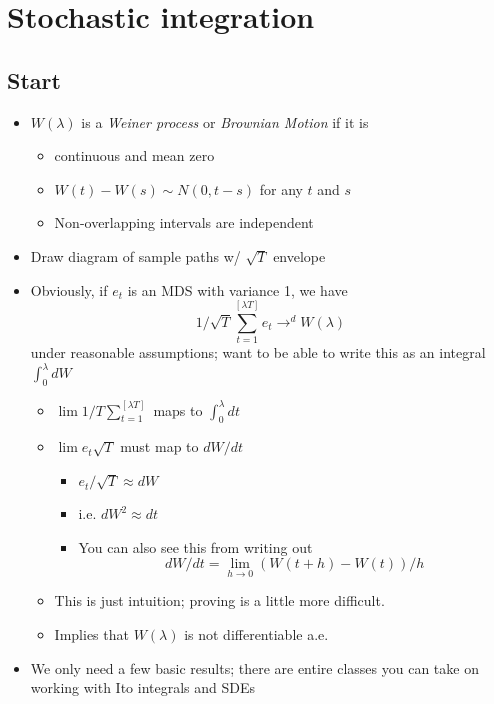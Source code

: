 

\section{Stochastic integration}

\subsection{Start}

\begin{itemize}
\item
  $W(\lambda)$ is a \emph{Weiner process} or \emph{Brownian Motion} if it is
  \begin{itemize}
  \item continuous and mean zero
  \item $W(t) - W(s) \sim N(0, t-s)$ for any $t$ and $s$
  \item Non-overlapping intervals are independent
  \end{itemize}
\item Draw diagram of sample paths w/ $\sqrt T$ envelope
\item Obviously, if $e_t$ is an MDS with variance 1, we have
  \[1/\sqrt{T} \sum_{t=1}^{[\lambda T]} e_t \to^d W(\lambda)\]
  under reasonable assumptions; want to be able to write this as an
  integral $\int_0^\lambda dW$

  \begin{itemize}
  \item
    $\lim 1/T \sum_{t=1}^{[\lambda T]}$ maps to $\int_0^\lambda dt$
  \item
    $\lim e_t \sqrt{T}$ must map to $dW/dt$

    \begin{itemize}
    \item $e_t/\sqrt{T} ≈ dW$
    \item i.e. $dW^2 ≈ dt$
    \item You can also see this from writing out
      \[dW/dt = \lim_{h \to 0} (W(t+h) - W(t)) / h\]
    \end{itemize}
  \item This is just intuition; proving is a little more difficult.
  \item Implies that $W(\lambda)$ is not differentiable a.e.
  \end{itemize}
\item We only need a few basic results; there are entire classes you
  can take on working with Ito integrals and SDEs
\end{itemize}

